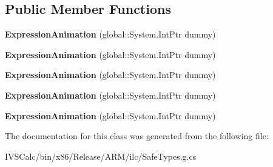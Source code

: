 \subsection*{Public Member Functions}
\begin{DoxyCompactItemize}
\item 
\mbox{\label{class_windows_1_1_u_i_1_1_composition_1_1_expression_animation_aaf675a52df2f2805ed5316249dcdc466}} 
{\bfseries Expression\+Animation} (global\+::\+System.\+Int\+Ptr dummy)
\item 
\mbox{\label{class_windows_1_1_u_i_1_1_composition_1_1_expression_animation_aaf675a52df2f2805ed5316249dcdc466}} 
{\bfseries Expression\+Animation} (global\+::\+System.\+Int\+Ptr dummy)
\item 
\mbox{\label{class_windows_1_1_u_i_1_1_composition_1_1_expression_animation_aaf675a52df2f2805ed5316249dcdc466}} 
{\bfseries Expression\+Animation} (global\+::\+System.\+Int\+Ptr dummy)
\item 
\mbox{\label{class_windows_1_1_u_i_1_1_composition_1_1_expression_animation_aaf675a52df2f2805ed5316249dcdc466}} 
{\bfseries Expression\+Animation} (global\+::\+System.\+Int\+Ptr dummy)
\item 
\mbox{\label{class_windows_1_1_u_i_1_1_composition_1_1_expression_animation_aaf675a52df2f2805ed5316249dcdc466}} 
{\bfseries Expression\+Animation} (global\+::\+System.\+Int\+Ptr dummy)
\end{DoxyCompactItemize}


The documentation for this class was generated from the following file\+:\begin{DoxyCompactItemize}
\item 
I\+V\+S\+Calc/bin/x86/\+Release/\+A\+R\+M/ilc/Safe\+Types.\+g.\+cs\end{DoxyCompactItemize}
